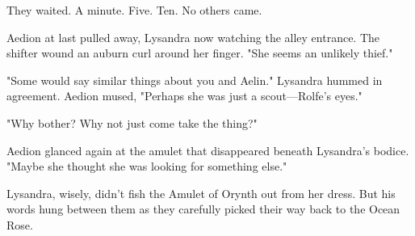 They waited.
A minute.
Five.
Ten.
No others came.

Aedion at last pulled away, Lysandra now watching the alley entrance.
The shifter wound an auburn curl around her finger.
"She seems an unlikely thief."

"Some would say similar things about you and Aelin."
Lysandra hummed in agreement.
Aedion mused, "Perhaps she was just a scout---Rolfe's eyes."

"Why bother?
Why not just come take the thing?"

Aedion glanced again at the amulet that disappeared beneath Lysandra's bodice.
"Maybe she thought she was looking for something else."

Lysandra, wisely, didn't fish the Amulet of Orynth out from her dress.
But his words hung between them as they carefully picked their way back to the Ocean Rose.
